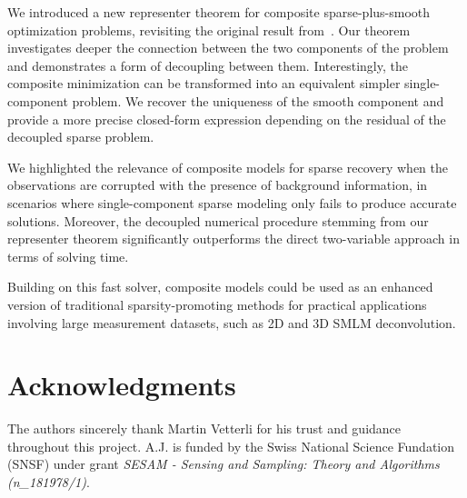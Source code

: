 \documentclass[12pt]{article}
\begin{document}
    We introduced a new representer theorem for composite sparse-plus-smooth optimization problems, revisiting the original result from~\cite{debarre2021continuous}. Our theorem investigates deeper the connection between the two components of the problem and demonstrates a form of decoupling between them. Interestingly, the composite minimization can be transformed into an equivalent simpler single-component problem. We recover the uniqueness of the smooth component and provide a more precise closed-form expression depending on the residual of the decoupled sparse problem.

    We highlighted the relevance of composite models for sparse recovery when the observations are corrupted with the presence of background information, in scenarios where single-component sparse modeling only fails to produce accurate solutions. Moreover, the decoupled numerical procedure stemming from our representer theorem significantly outperforms the direct two-variable approach in terms of solving time.

    Building on this fast solver, composite models could be used as an enhanced version of traditional sparsity-promoting methods for practical applications involving large measurement datasets, such as 2D and 3D SMLM deconvolution.



\section*{Acknowledgments}
    The authors sincerely thank Martin Vetterli for his trust and guidance throughout this project.   
    A.J. is funded by the Swiss National Science Fundation (SNSF) under grant \emph{SESAM - Sensing and Sampling: Theory and Algorithms (n\_181978/1)}.
    




\end{document}
